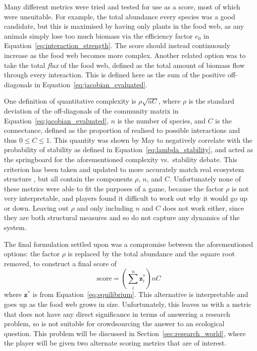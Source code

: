Many different metrics were tried and tested for use as a score, most of which were unsuitable. For example, the total abundance every species was a good candidate, but this is maximised by having only plants in the food web, as any animals simply lose too much biomass via the efficiency factor $e_0$ in Equation~\eqref{eq:interaction_strength}. The score should instead continuously increase as the food web becomes more complex. Another related option was to take the total \emph{flux} of the food web, defined as the total amount of biomass flow through every interaction. This is defined here as the sum of the positive off-diagonals in Equation~\eqref{eq:jacobian_evaluated}.

One definition of quantitative complexity is $\rho\sqrt{nC}$, where $\rho$ is the standard deviation of the off-diagonals of the community matrix in Equation~\ref{eq:jacobian_evaluated}, $n$ is the number of species, and $C$ is the connectance, defined as the proportion of realised to possible interactions and thus $0\leq C\leq1$. This quantity was shown by May to negatively correlate with the probability of stability as defined in Equation~\eqref{eq:lambda_stability}, and acted as the springboard for the aforementioned complexity vs.\ stability debate.
This criterion has been taken and updated to more accurately match real ecosystem structure \cite{Allesina2012, Tang2014Correlation}, but all contain the components $\rho$, $n$, and $C$.
Unfortunately none of these metrics were able to fit the purposes of a game, because the factor $\rho$ is not very interpretable, and players found it difficult to work out why it would go up or down.
Leaving out $\rho$ and only including $n$ and $C$ does not work either, since they are both structural measures and so do not capture any dynamics of the system.

The final formulation settled upon was a compromise between the aforementioned options: the factor $\rho$ is replaced by the total abundance and the square root removed, to construct a final score of
\begin{equation}
  \mathrm{score} = \left(\sum^n_i\mathbf{z}^*_i\right)nC
\end{equation}
where $\mathbf{z^*}$ is from Equation~\eqref{eq:equilibrium}. This alternative is interpretable and goes up as the food web grows in size.
Unfortunately, this leaves us with a metric that does not have any direct significance in terms of answering a research problem, so is not suitable for crowdsourcing the answer to an ecological question. This problem will be discussed in Section~\ref{sec:research_world}, where the player will be given two alternate scoring metrics that are of interest.

